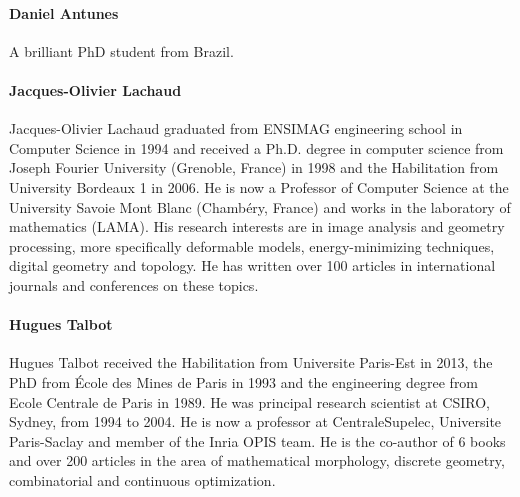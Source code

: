 

\paragraph{Daniel Antunes}
A brilliant PhD student from Brazil.

\paragraph{Jacques-Olivier Lachaud}
Jacques-Olivier Lachaud graduated from ENSIMAG engineering school in
Computer Science in 1994 and received a Ph.D. degree in computer
science from Joseph Fourier University (Grenoble, France) in 1998 and
the Habilitation from University Bordeaux 1 in 2006. He is now a
Professor of Computer Science at the University Savoie Mont Blanc
(Chambéry, France) and works in the laboratory of mathematics
(LAMA). His research interests are in image analysis and geometry
processing, more specifically deformable models, energy-minimizing
techniques, digital geometry and topology. He has written over 100
articles in international journals and conferences on these topics.

\paragraph{Hugues Talbot}
Hugues Talbot received the Habilitation from Universite Paris-Est in 2013, the PhD from \'Ecole des Mines de Paris in
1993 and the engineering degree from Ecole Centrale de Paris in 1989. He was principal research scientist at CSIRO,
Sydney, from 1994 to 2004. He is now a professor at CentraleSupelec, Universite Paris-Saclay and member of the Inria
OPIS team. He is the co-author of 6 books and over 200 articles in the area of mathematical morphology, discrete
geometry, combinatorial and continuous optimization.

